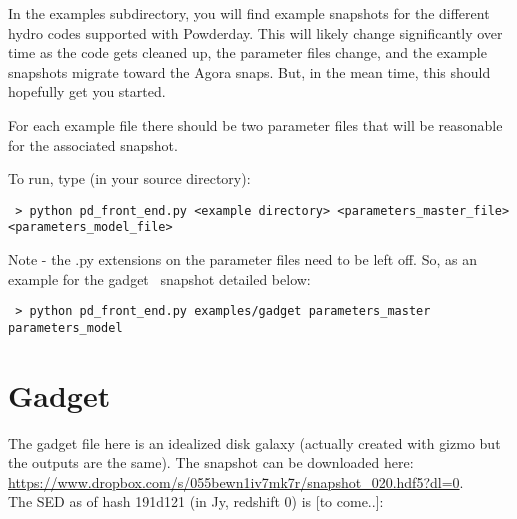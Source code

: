 In the examples subdirectory, you will find example snapshots for the
different hydro codes supported with Powderday. This will likely
change significantly over time as the code gets cleaned up, the
parameter files change, and the example snapshots migrate toward the
Agora snaps.  But, in the mean time, this should hopefully get you started.

For each example file there should be two parameter files that will be
reasonable for the associated snapshot.

To run, type (in your source directory):\\
\begin{verbatim}
 > python pd_front_end.py <example directory> <parameters_master_file> <parameters_model_file>
\end{verbatim}
Note - the .py extensions on the parameter files need to be left off.  So, as an example for the {\sc gadget} \ snapshot detailed below:
\begin{verbatim}
 > python pd_front_end.py examples/gadget parameters_master parameters_model
\end{verbatim}

\section{Gadget}

The {\sc gadget} file here is an idealized disk galaxy (actually
created with {\sc gizmo} but the outputs are the same).  The snapshot
can be downloaded here:
\url{https://www.dropbox.com/s/055bewn1iv7mk7r/snapshot_020.hdf5?dl=0}.\\
\newline
The SED as of hash 191d121 (in Jy, redshift 0) is [to come..]:

